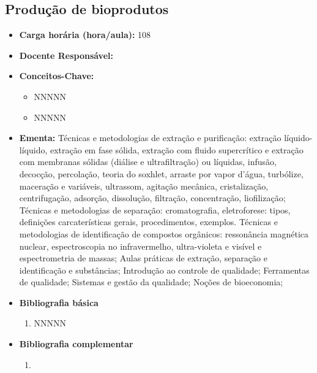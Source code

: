 \documentclass[11pt,fleqn]{book} %
\begin{document}
\subsection{Produção de bioprodutos}\label{disc:producao}
\begin{itemize}
	\item \textbf{Carga horária (hora/aula):} 108
	\item \textbf{Docente Responsável:}
	\item \textbf{Conceitos-Chave:}
	\begin{itemize}
		\item NNNNN
		\item NNNNN
	\end{itemize}
	\item \textbf{Ementa:} 
	Técnicas e metodologias de extração e purificação: extração líquido-líquido, extração em fase sólida, extração com fluido supercrítico e extração com membranas sólidas (diálise e ultrafiltração) ou líquidas, infusão, decocção, percolação, teoria do soxhlet, arraste por vapor d’água, turbólize, maceração e variáveis, ultrassom, agitação mecânica, cristalização, centrifugação, adsorção, dissolução, filtração, concentração, liofilização; 
	Técnicas e metodologias de separação: cromatografia, eletroforese: tipos, definições carcaterísticas gerais, procedimentos, exemplos. 
	Técnicas e metodologias de identificação de compostos orgânicos: ressonância magnética nuclear, espectroscopia no infravermelho, ultra-violeta e visível e espectrometria de massas; 
	Aulas práticas de extração, separação e identificação e substâncias;
	Introdução ao controle de qualidade; 
	Ferramentas de qualidade; 
	Sistemas e gestão da qualidade;
	Noções de bioeconomia;
	\item \textbf{Bibliografia básica}
	\begin{enumerate}
		\item NNNNN
	\end{enumerate}
	\item \textbf{Bibliografia complementar}
	\begin{enumerate}
		\item 
	\end{enumerate}	
\end{itemize}



\newpage
\end{document}
